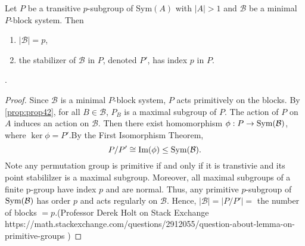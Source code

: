 \begin{lemma}Let $P$ be a transitive $p$-subgroup of Sym$(A)$ with $|A|>1$ and $\mathcal{B}$ be a minimal $P$-block system. Then \begin{enumerate}
    \item $|\mathcal{B}|=p$,
    \item the stabilizer of $\mathcal{B}$ in $P$, denoted $P'$, has index $p$ in $P$.
\end{enumerate}\cite{luks1982}. 
\end{lemma}
\begin{proof}
    Since $\mathcal{B}$ is a minimal $P$-block system, $P$ acts primitively on the blocks. By \ref{prop:prop42}, for all $B\in\mathcal{B}$, $P_B$ is a maximal subgroup of $P$. The action of $P$ on $A$ induces an action on $\mathcal{B}$. Then there exist homomorphism $\phi:P\rightarrow\text{Sym}(\mathcal{B})$, where $\ker\phi=P'$.By the First Isomorphism Theorem, \[P/P'\cong\text{Im}(\phi)\le\text{Sym}(\mathcal{B}).\]
    Note any permutation group is primitive if and only if it is transtivie and its point stabililzer is a maximal subgroup. Moreover, all maximal subgroups of a finite p-group have index $p$ and are normal. Thus, any primitive $p$-subgroup of $\text{Sym}(\mathcal{B})$ has order $p$ and acts regularly on $\mathcal{B}$. Hence, $|\mathcal{B}|=|P/P'|=$ the number of blocks $=p$.(Professor Derek Holt on Stack Exchange https://math.stackexchange.com/questions/2912055/question-about-lemma-on-primitive-groups )
\end{proof}

